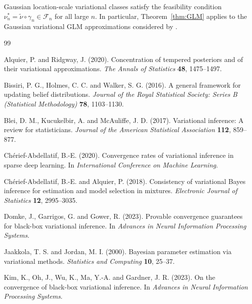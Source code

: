 \documentclass[11pt]{article}
\theoremstyle{plain}
\theoremstyle{definition}
\theoremstyle{remark}
\begin{document}
Gaussian location-scale variational classes satisfy the feasibility
condition $\nu_{n}^{*}=\tilde\nu\circ\gamma_{n}\in\mathcal{F}_{n}$ for all
large $n$. In particular, Theorem~\ref{thm:GLM} applies to
the Gaussian variational GLM approximations considered by \citet{JaakkolaJordan2000,KnowlesMinka2011}.

\begin{thebibliography}{99}

Alquier, P. and Ridgway, J. (2020).
Concentration of tempered posteriors and of their variational approximations.
\emph{The Annals of Statistics} \textbf{48}, 1475--1497.

Bissiri, P. G., Holmes, C. C. and Walker, S. G. (2016).
A general framework for updating belief distributions.
\emph{Journal of the Royal Statistical Society: Series B (Statistical Methodology)} \textbf{78}, 1103--1130.

Blei, D. M., Kucukelbir, A. and McAuliffe, J. D. (2017).
Variational inference: A review for statisticians.
\emph{Journal of the American Statistical Association} \textbf{112}, 859--877.

Ch{\'e}rief-Abdellatif, B.-E. (2020).
Convergence rates of variational inference in sparse deep learning.
In \emph{International Conference on Machine Learning}.

Ch{\'e}rief-Abdellatif, B.-E. and Alquier, P. (2018).
Consistency of variational Bayes inference for estimation and model selection in mixtures.
\emph{Electronic Journal of Statistics} \textbf{12}, 2995--3035.

Domke, J., Garrigos, G. and Gower, R. (2023).
Provable convergence guarantees for black-box variational inference.
In \emph{Advances in Neural Information Processing Systems}.

Jaakkola, T. S. and Jordan, M. I. (2000).
Bayesian parameter estimation via variational methods.
\emph{Statistics and Computing} \textbf{10}, 25--37.

Kim, K., Oh, J., Wu, K., Ma, Y.-A. and Gardner, J. R. (2023).
On the convergence of black-box variational inference.
In \emph{Advances in Neural Information Processing Systems}.


\end{thebibliography}
\end{document}
